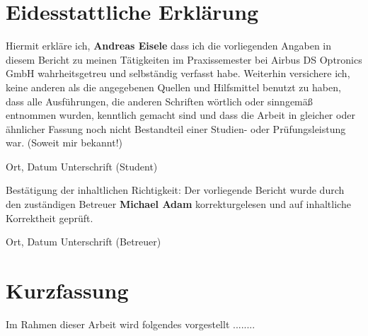 \documentclass[12pt,a4paper]{scrreprt}
\begin{document}
\newpage
\chapter{Eidesstattliche Erklärung}


\begin{minipage}{0.99\textwidth}

Hiermit erkläre ich, \textbf{Andreas Eisele}
dass ich die vorliegenden Angaben in diesem Bericht
zu meinen Tätigkeiten im Praxissemester bei
Airbus DS Optronics GmbH
wahrheitsgetreu und selbständig verfasst habe.
Weiterhin versichere ich, keine anderen als die angegebenen Quellen und Hilfsmittel benutzt zu haben, dass alle Ausführungen, die anderen Schriften wörtlich oder sinngemäß entnommen wurden, kenntlich gemacht sind und dass die Arbeit in gleicher oder ähnlicher Fassung noch nicht Bestandteil einer Studien- oder
Prüfungsleistung war. (Soweit mir bekannt!)

\vspace{2cm}

\end{minipage}

\begin{minipage}{0.99\textwidth}

Ort,  Datum \hspace{3cm} Unterschrift (Student)

\end{minipage}


\vspace{3cm}

\begin{minipage}{0.99\textwidth}

Bestätigung der inhaltlichen Richtigkeit:
Der vorliegende Bericht wurde durch den zuständigen Betreuer
\textbf{Michael Adam} korrekturgelesen und auf inhaltliche Korrektheit geprüft.

\vspace{2cm}

\end{minipage}


\begin{minipage}{0.99\textwidth}

Ort, Datum \hspace{3cm} Unterschrift (Betreuer)

\end{minipage}


\newpage
\chapter{Kurzfassung}
Im Rahmen dieser Arbeit wird folgendes vorgestellt ........
\end{document}
